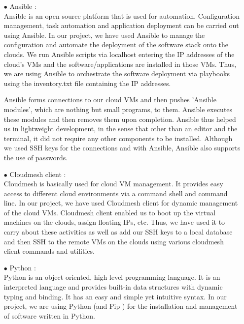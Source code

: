 \documentclass[9pt,twocolumn,twoside]{../../styles/osajnl}
\begin{document}
\begin{itemize}

\item[$\bullet$] Ansible \cite{Ansible}: \\
Ansible is an open source platform that is used for automation.
Configuration management, task automation and application deployment
can be carried out using Ansible.  In our project, we have used
Ansible to manage the configuration and automate the deployment of the
software stack onto the clouds.  We run Ansible scripts via localhost
entering the IP addresses of the cloud's VMs and
the software/applications are installed in those VMs.  Thus, we are
using Ansible to orchestrate the software deployment via playbooks
using the inventory.txt file containing the IP addresses.

Ansible forms connections to our cloud VMs and then pushes 'Ansible modules', which are nothing but small programs, to them.  Ansible executes these modules and then removes them upon completion.  Ansible thus helped us in lightweight development, in the sense that other than an editor and the terminal, it did not require any other components to be installed.  Although we used SSH keys for the connections and with Ansible, Ansible also supports the use of passwords.  

\item[$\bullet$] Cloudmesh client \cite{github-cloudmesh-client}: \\
Cloudmesh is basically used for cloud VM management.  It provides
easy access to different cloud environments via a command shell and
command line.  In our project, we have used Cloudmesh client for
dynamic management of the cloud VMs.  Cloudmesh client enabled us to boot up the virtual machines on the clouds, assign floating IPs, etc.  Thus, we have used it to carry about these activities as well as add
our SSH keys to a local database and then SSH to the remote VMs on
the clouds using various cloudmesh client commands and utilities.  

\item[$\bullet$] Python \cite{Python}: \\
Python is an object oriented, high level programming language.  It is
an interpreted language and provides built-in data structures with
dynamic typing and binding.  It has an easy and simple yet intuitive
syntax.  In our project, we are using Python (and Pip \cite{Pip}) for
the installation and management of software written in Python.


\end{itemize}
\end{document}
